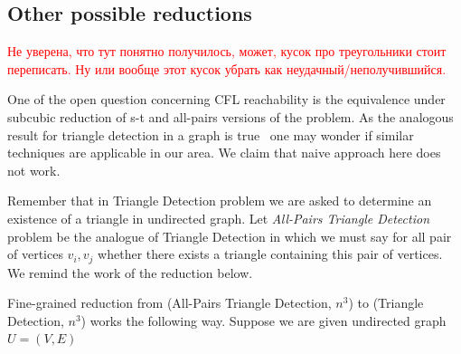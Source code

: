 \documentclass[12pt]{article}
\begin{document}
\subsection{Other possible reductions}
\label{subsec:other_red}

\iffalse
\textcolor{red}{Не уверена, что тут понятно получилось, может, кусок про треугольники стоит переписать. Ну или вообще этот кусок убрать как неудачный/неполучившийся.}

One of the open question concerning CFL reachability is the equivalence under subcubic reduction of s-t and all-pairs versions of the problem. As the analogous result for triangle detection in a graph is true~\cite{10.1145/3186893} one may wonder if similar techniques are applicable in our area. We claim that naive approach here does not work. 

Remember that in Triangle Detection problem we are asked to determine an existence of a triangle in undirected graph. Let \textit{All-Pairs Triangle Detection} problem be the analogue of Triangle Detection in which we must say for all pair of vertices $v_i, v_j$ whether there exists a triangle containing this pair of vertices. We remind the work of the reduction below.

Fine-grained reduction from (All-Pairs Triangle Detection, $n^3$) to (Triangle Detection, $n^3$) works the following way. Suppose we are given undirected graph $U = (V, E)$
\end{document}
